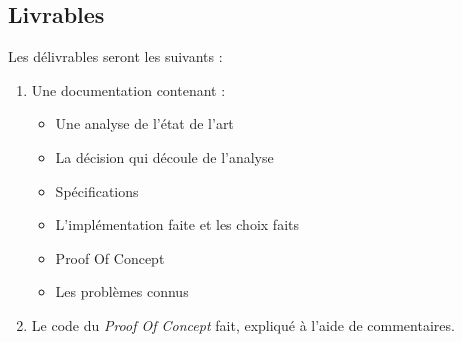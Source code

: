 \subsection*{Livrables}
Les délivrables seront les suivants :
\begin{enumerate}
\item Une documentation contenant :
	\begin{itemize}
	\item Une analyse de l'état de l'art
	\item La décision qui découle de l’analyse
	\item Spécifications
	\item L'implémentation faite et les choix faits
	\item Proof Of Concept
	\item Les problèmes connus
	\end{itemize}
\item Le code du \textit{Proof Of Concept} fait, expliqué à l'aide de commentaires.
\end{enumerate}

